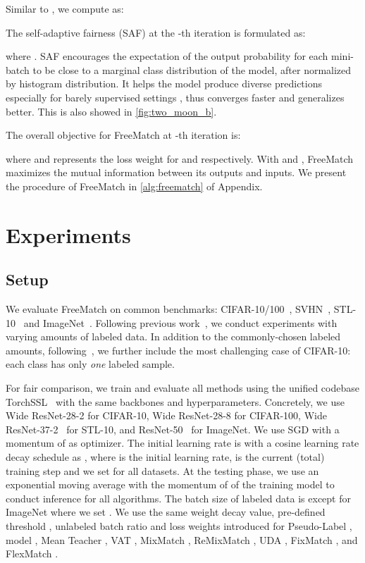 \documentclass{article} \usepackage{iclr2023_conference,times}
\theoremstyle{plain}
\theoremstyle{definition}
\theoremstyle{remark}
\newcommand{\ourmethod}{FreeMatch\xspace}
\begin{document}
Similar to , we compute  as:


The self-adaptive fairness (SAF)  at the -th iteration is formulated as:

where . SAF encourages the expectation of the output probability for each mini-batch to be close to a marginal class distribution of the model, after normalized by histogram distribution.
It helps the model produce diverse predictions especially for barely supervised settings \citep{sohn2020fixmatch}, thus converges faster and generalizes better.
This is also showed in \cref{fig:two_moon_b}.



The overall objective for \ourmethod at -th iteration is:

where  and  represents the loss weight for  and  respectively.
With  and , \ourmethod maximizes the mutual information between its outputs and inputs.
We present the procedure of \ourmethod in \cref{alg:freematch} of Appendix.

\section{Experiments}

\subsection{Setup}

We evaluate \ourmethod on common benchmarks: CIFAR-10/100~\citep{krizhevsky2009learning}, SVHN~\citep{netzer2011reading}, STL-10~\citep{coates2011analysis} and ImageNet~\citep{deng2009imagenet}.
Following previous work~\citep{sohn2020fixmatch,xu2021dash,zhang2021flexmatch,oliver2018realistic}, we conduct experiments with varying amounts of labeled data. In addition to the commonly-chosen labeled amounts, following~\citep{sohn2020fixmatch}, we further include the most challenging case of CIFAR-10: each class has only \emph{one} labeled sample.

For fair comparison, we train and evaluate all methods using the unified codebase TorchSSL~\citep{zhang2021flexmatch} with the same backbones and hyperparameters.
Concretely, we use Wide ResNet-28-2 \citep{zagoruyko2016wide} for CIFAR-10, Wide ResNet-28-8 for CIFAR-100, Wide ResNet-37-2~\citep{zhou2020time} for STL-10, and ResNet-50~\citep{he2016deep} for ImageNet. We use SGD with a momentum of  as optimizer. The initial learning rate is  with a cosine learning rate decay schedule as , where  is the initial learning rate,  is the current (total) training step and we set  for all datasets.
At the testing phase, we use an exponential moving average with the momentum of  of the training model to conduct inference for all algorithms.
The batch size of labeled data is  except for ImageNet where we set .
We use the same weight decay value, pre-defined threshold , unlabeled batch ratio  and loss weights introduced for Pseudo-Label \citep{lee2013pseudo},  model \citep{rasmus2015semi}, Mean Teacher \citep{tarvainen2017mean}, VAT \citep{miyato2018virtual}, MixMatch \citep{berthelot2019mixmatch}, ReMixMatch \citep{berthelot2019remixmatch}, UDA \citep{xie2020unsupervised}, FixMatch \citep{sohn2020fixmatch}, and FlexMatch \citep{zhang2021flexmatch}.
\end{document}
